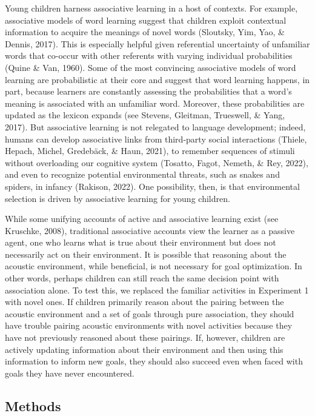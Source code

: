 \documentclass[10pt, letterpaper]{article}
\begin{document}
Young children harness associative learning in a host of contexts. For
example, associative models of word learning suggest that children
exploit contextual information to acquire the meanings of novel words
(Sloutsky, Yim, Yao, \& Dennis, 2017). This is especially helpful given
referential uncertainty of unfamiliar words that co-occur with other
referents with varying individual probabilities (Quine \& Van, 1960).
Some of the most convincing associative models of word learning are
probabilistic at their core and suggest that word learning happens, in
part, because learners are constantly assessing the probabilities that a
word's meaning is associated with an unfamiliar word. Moreover, these
probabilities are updated as the lexicon expands (see Stevens, Gleitman,
Trueswell, \& Yang, 2017). But associative learning is not relegated to
language development; indeed, humans can develop associative links from
third-party social interactions (Thiele, Hepach, Michel, Gredebäck, \&
Haun, 2021), to remember sequences of stimuli without overloading our
cognitive system (Tosatto, Fagot, Nemeth, \& Rey, 2022), and even to
recognize potential environmental threats, such as snakes and spiders,
in infancy (Rakison, 2022). One possibility, then, is that environmental
selection is driven by associative learning for young children.

While some unifying accounts of active and associative learning exist
(see Kruschke, 2008), traditional associative accounts view the learner
as a passive agent, one who learns what is true about their environment
but does not necessarily act on their environment. It is possible that
reasoning about the acoustic environment, while beneficial, is not
necessary for goal optimization. In other words, perhaps children can
still reach the same decision point with association alone. To test
this, we replaced the familiar activities in Experiment 1 with novel
ones. If children primarily reason about the pairing between the
acoustic environment and a set of goals through pure association, they
should have trouble pairing acoustic environments with novel activities
because they have not previously reasoned about these pairings. If,
however, children are actively updating information about their
environment and then using this information to inform new goals, they
should also succeed even when faced with goals they have never
encountered.

\hypertarget{methods-1}{%
\subsection{Methods}\label{methods-1}}
\end{document}
